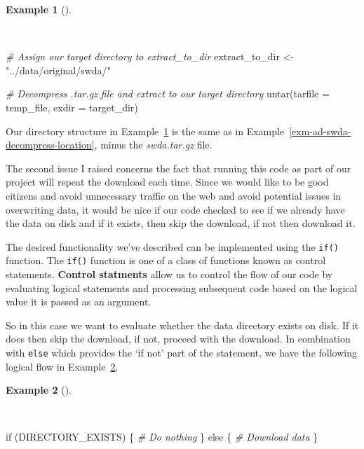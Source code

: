 \documentclass[
  letterpaper,
  DIV=11,
  numbers=noendperiod]{scrreport}
\newenvironment{Shaded}{\begin{snugshade}}{\end{snugshade}}
\newcommand{\AttributeTok}[1]{\textcolor[rgb]{0.00,0.00,0.00}{#1}}
\newcommand{\CommentTok}[1]{\textcolor[rgb]{0.00,0.00,0.00}{\textit{#1}}}
\newcommand{\ControlFlowTok}[1]{\textcolor[rgb]{0.00,0.00,0.00}{#1}}
\newcommand{\FunctionTok}[1]{\textcolor[rgb]{0.00,0.00,0.00}{#1}}
\newcommand{\NormalTok}[1]{\textcolor[rgb]{0.00,0.00,0.00}{#1}}
\newcommand{\OtherTok}[1]{\textcolor[rgb]{0.00,0.00,0.00}{#1}}
\newcommand{\StringTok}[1]{\textcolor[rgb]{0.00,0.00,0.00}{#1}}
\theoremstyle{definition}
\newtheorem{example}{Example}[chapter]
\theoremstyle{remark}
\begin{document}
\begin{example}[]\protect\hypertarget{exm-ad-swda-untar-temp}{}\label{exm-ad-swda-untar-temp}

~

\begin{Shaded}
\begin{Highlighting}[]
\CommentTok{\# Assign our target directory to \textasciigrave{}extract\_to\_dir\textasciigrave{}}
\NormalTok{extract\_to\_dir }\OtherTok{\textless{}{-}} \StringTok{"../data/original/swda/"}

\CommentTok{\# Decompress .tar.gz file and extract to our target directory}
\FunctionTok{untar}\NormalTok{(}\AttributeTok{tarfile =}\NormalTok{ temp\_file, }\AttributeTok{exdir =}\NormalTok{ target\_dir)}
\end{Highlighting}
\end{Shaded}

\end{example}

Our directory structure in Example~\ref{exm-ad-swda-untar-temp} is the
same as in Example~\ref{exm-ad-swda-decompress-location}, minus the
\emph{swda.tar.gz} file.

The second issue I raised concerns the fact that running this code as
part of our project will repeat the download each time. Since we would
like to be good citizens and avoid unnecessary traffic on the web and
avoid potential issues in overwriting data, it would be nice if our code
checked to see if we already have the data on disk and if it exists,
then skip the download, if not then download it.

The desired functionality we've described can be implemented using the
\texttt{if()} function. The \texttt{if()} function is one of a class of
functions known as control statements. \textbf{Control statments} allow
us to control the flow of our code by evaluating logical statements and
processing subsequent code based on the logical value it is passed as an
argument.

So in this case we want to evaluate whether the data directory exists on
disk. If it does then skip the download, if not, proceed with the
download. In combination with \texttt{else} which provides the `if not'
part of the statement, we have the following logical flow in
Example~\ref{exm-ad-if-dir-exists}.

\begin{example}[]\protect\hypertarget{exm-ad-if-dir-exists}{}\label{exm-ad-if-dir-exists}

~

\begin{Shaded}
\begin{Highlighting}[]
\ControlFlowTok{if}\NormalTok{ (DIRECTORY\_EXISTS) \{}
  \CommentTok{\# Do nothing}
\NormalTok{\} }\ControlFlowTok{else}\NormalTok{ \{}
  \CommentTok{\# Download data}
\NormalTok{\}}
\end{Highlighting}
\end{Shaded}

\end{example}
\end{document}
